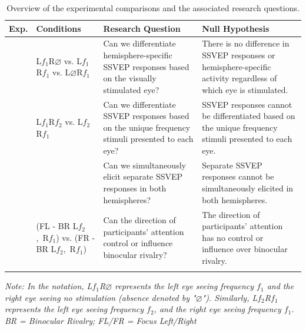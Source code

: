 \begin{landscape}
    \begin{table}
    \centering
    \begin{tabularx}{\linewidth}{>{\centering\arraybackslash}p{0.75cm}>{\centering\arraybackslash}p{3.5cm}>{\raggedright\arraybackslash}X>{\raggedright\arraybackslash}X}
        \hline
        
        \textbf{Exp.} & \textbf{Conditions} & \textbf{Research Question} & \textbf{Null Hypothesis} \\
        
        \hline
        \addlinespace
        1 & L$f_{1}$R$\varnothing$ vs. L$f_{1}$R$f_{1}$ vs. L$\varnothing$R$f_{1}$ & 
        Can we differentiate hemisphere-specific SSVEP responses based on the visually stimulated eye? & There is no difference in SSVEP responses or hemisphere-specific activity regardless of which eye is stimulated. \\
        \addlinespace
        \addlinespace
        \addlinespace
        2 & L$f_{1}$R$f_{2}$ vs. L$f_{2}$R$f_{1}$ & 
        Can we differentiate SSVEP responses based on the unique frequency stimuli presented to each eye? & SSVEP responses cannot be differentiated based on the unique frequency stimuli presented to each eye. \\ 
        \addlinespace
        & & Can we simultaneously elicit separate SSVEP responses in both hemispheres? & Separate SSVEP responses cannot be simultaneously elicited in both hemispheres. \\
        \addlinespace
        4 & \makecell{(FL - BR L$f_{2}$,~R$f_{1}$)\\vs.\\(FR - BR L$f_{2}$,~R$f_{1}$)} & Can the direction of participants' attention control or influence binocular rivalry? & The direction of participants' attention has no control or influence over binocular rivalry. \\
        \addlinespace
        \hline
    \end{tabularx}
    \caption{Overview of the experimental comparisons and the associated research questions.}
    \emph{Note: In the notation, L$f_{1}$R$\varnothing$ represents the left eye seeing frequency $f_{1}$ and the right eye seeing no stimulation (absence denoted by "$\varnothing$"). Similarly, L$f_{2}$R$f_{1}$ represents the left eye seeing frequency $f_{2}$, and the right eye seeing frequency $f_{1}$. \\
    BR = Binocular Rivalry; FL/FR = Focus Left/Right}
    \label{tab:comparisons}
\end{table}
\end{landscape}

